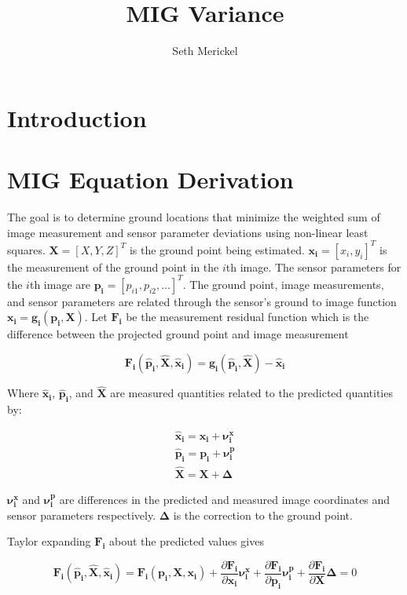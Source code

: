 \documentclass[]{article}
\title{MIG Variance}
\author{Seth Merickel}
\newcommand{\imgmeashat}{\pmb{\hat{x}_{i}}}
\newcommand{\imgmeas}{\pmb{x_{i}}}
\newcommand{\grndhat}{\pmb{\hat{X}}}
\newcommand{\grnd}{\pmb{X}}
\newcommand{\sensmeashat}{\pmb{\hat{p}_i}}
\newcommand{\sensmeas}{\pmb{p_i}}
\newcommand{\imgnu}{\pmb{\nu_{i}^x}}
\newcommand{\sensnu}{\pmb{\nu_i^p}}
\newcommand{\grndupdate}{\pmb{\Delta}}
\newcommand{\Fimgpartials}{\frac{\partial{\pmb{F_{i}}}}{\partial{\imgmeas}}}
\newcommand{\Fgrndpartials}{\frac{\partial{\pmb{F_{i}}}}{\partial{\grnd}}}
\newcommand{\Fsenspartials}{\frac{\partial{\pmb{F_{i}}}}{\partial{\sensmeas}}}
\begin{document}
\maketitle


\section*{Introduction}


\section*{MIG Equation Derivation}
The goal is to determine ground locations that minimize the weighted sum of image measurement and sensor parameter deviations using non-linear least squares.  $\grnd = [X, Y, Z]^T$ is the ground point being estimated.  $\imgmeas = [x_{i}, y_{i}]^T$ is the measurement of the ground point in the $i$th image.  The sensor parameters for the $i$th image are $\sensmeas = [p_{i1}, p_{i2}, \ldots]^T$. The ground point, image measurements, and sensor parameters are related through the sensor's ground to image function $\imgmeas = \pmb{g_i}(\sensmeas, \grnd)$.  Let $\pmb{F_{i}}$ be the measurement residual function which is the difference between the projected ground point and image measurement

\begin{equation*}
\pmb{F_{i}}(\sensmeashat, \grndhat,\imgmeashat)=\pmb{g_i}(\sensmeashat,\grndhat)-\imgmeashat
\end{equation*}

Where $\imgmeashat$, $\sensmeashat$, and $\grndhat$ are measured quantities related to the predicted quantities by:

\begin{equation*}
\begin{split}
\imgmeashat = \imgmeas + \imgnu\\
\sensmeashat    = \sensmeas + \sensnu\\
\grndhat    = \grnd + \grndupdate
\end{split}
\end{equation*}

$\imgnu$ and $\sensnu$ are differences in the predicted and measured image coordinates and sensor parameters respectively.  $\grndupdate$ is the correction to the ground point.

Taylor expanding $\pmb{F_{i}}$ about the predicted values gives

\begin{equation} \label{taylor_eq}
\pmb{F_{i}}(\sensmeashat, \grndhat, \imgmeashat) = 
\pmb{F_{i}}(\sensmeas, \grnd, \imgmeas) + \Fimgpartials\imgnu + \Fsenspartials\sensnu + \Fgrndpartials\grndupdate = 0
\end{equation}
\end{document}
